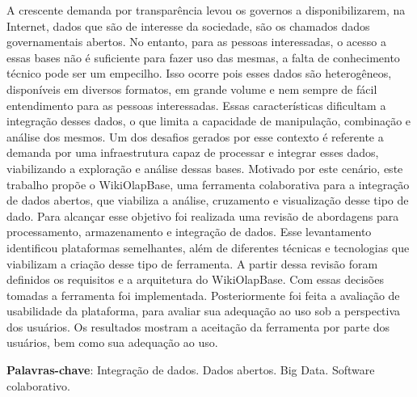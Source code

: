 
\begin{resumo}
   
   A crescente demanda por transparência levou os governos a disponibilizarem, na Internet, 
   dados que são de interesse da sociedade, são os chamados dados governamentais abertos. No 
   entanto, para as pessoas interessadas, o acesso a essas bases não é suficiente para fazer 
   uso das mesmas, a falta de conhecimento técnico pode ser um empecilho. Isso ocorre pois 
   esses dados são heterogêneos, disponíveis em diversos formatos, em grande volume e nem 
   sempre de fácil entendimento para as pessoas interessadas. Essas características dificultam 
   a integração desses dados, o que limita a capacidade de manipulação, combinação e análise 
   dos mesmos. Um dos desafios gerados por esse contexto é referente a demanda por uma 
   infraestrutura capaz de processar e integrar esses dados, viabilizando a exploração e 
   análise dessas bases. Motivado por este cenário, este trabalho propõe o WikiOlapBase,
   uma ferramenta colaborativa para a integração de dados abertos, que viabiliza a análise, 
   cruzamento e visualização desse tipo de dado. Para alcançar esse objetivo foi realizada 
   uma revisão de abordagens para processamento, armazenamento e integração de dados. 
   Esse levantamento identificou plataformas semelhantes, além de diferentes técnicas e 
   tecnologias que viabilizam a criação desse tipo de ferramenta. A partir dessa revisão foram 
   definidos os requisitos e a arquitetura do WikiOlapBase. Com essas decisões tomadas a 
   ferramenta foi implementada. Posteriormente foi feita a avaliação de usabilidade da 
   plataforma, para avaliar sua adequação ao uso sob a perspectiva dos usuários. 
   Os resultados mostram a aceitação da ferramenta por parte dos usuários, bem como sua 
   adequação ao uso.

    \textbf{Palavras-chave}: Integração de dados. Dados abertos. Big Data. Software colaborativo.
\end{resumo}

